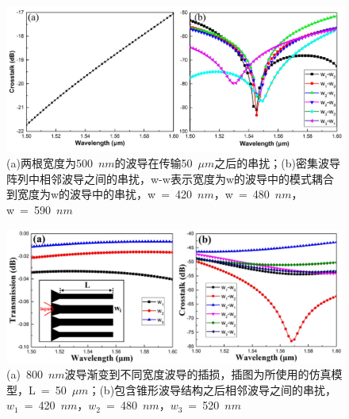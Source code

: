 \begin{figure}[htb]
	\centering
	\includegraphics[width=16cm]{./Pictures/edg_xtalk_no_taper.jpg}
	\captionsetup{justification=centering}
	\caption{(a)两根宽度为500~$nm$的波导在传输50~$\mu m$之后的串扰；(b)密集波导阵列中相邻波导之间的串扰，w-w表示宽度为w的波导中的模式耦合到宽度为w的波导中的串扰，w~=~420~$nm$，w~=~480~$nm$，w~=~590~$nm$}
	\label{edg_xtalk_no_taper}
\end{figure}

\begin{figure}[htb]
	\centering
	\includegraphics[width=16cm]{./Pictures/edg_taper_xtalk.jpg}
	\captionsetup{justification=centering}
	\caption{(a)~800~$nm$波导渐变到不同宽度波导的插损，插图为所使用的仿真模型，L~=~50~$\mu m$；(b)包含锥形波导结构之后相邻波导之间的串扰，$w_{1}$~=~420~$nm$，$w_{2}$~=~480~$nm$，$w_{3}$~=~520~$nm$}
	\label{edg_taper_xtalk}
\end{figure}

